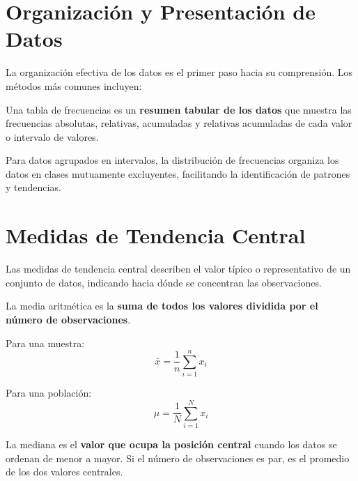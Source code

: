\section{Organización y Presentación de Datos}

La organización efectiva de los datos es el primer paso hacia su comprensión. Los métodos más comunes incluyen:

\begin{definition}
Una tabla de frecuencias es un \textbf{resumen tabular de los datos} que muestra las frecuencias absolutas, relativas, acumuladas y relativas acumuladas de cada valor o intervalo de valores.
\end{definition}

\begin{definition}
Para datos agrupados en intervalos, la distribución de frecuencias organiza los datos en clases mutuamente excluyentes, facilitando la identificación de patrones y tendencias.
\end{definition}

\section{Medidas de Tendencia Central}

Las medidas de tendencia central describen el valor típico o representativo de un conjunto de datos, indicando hacia dónde se concentran las observaciones.

\begin{definition}
La media aritmética es la \textbf{suma de todos los valores dividida por el número de observaciones}.

Para una muestra:
\begin{equation}
\bar{x} = \frac{1}{n} \sum_{i=1}^{n} x_i
\end{equation}

Para una población:
\begin{equation}
\mu = \frac{1}{N} \sum_{i=1}^{N} x_i
\end{equation}
\end{definition}

\begin{definition}[Mediana]
La mediana es el \textbf{valor que ocupa la posición central} cuando los datos se ordenan de menor a mayor. Si el número de observaciones es par, es el promedio de los dos valores centrales.
\end{definition}


